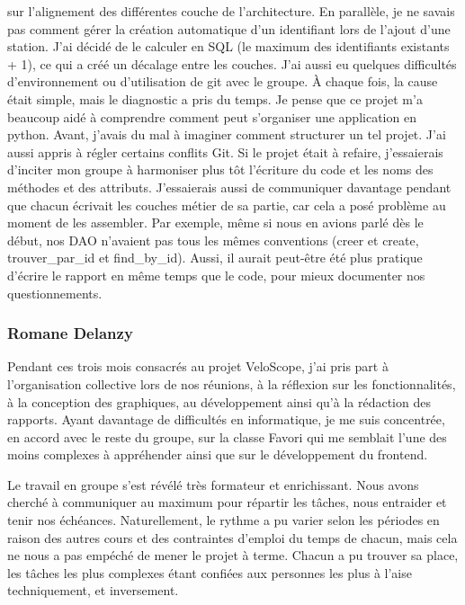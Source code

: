 \documentclass[
  french,
  11pt,
  a4paper,
]{article}
\begin{document}
sur l'alignement des différentes couche de l'architecture. En parallèle,
je ne savais pas comment gérer la création automatique d'un identifiant
lors de l'ajout d'une station. J'ai décidé de le calculer en SQL (le
maximum des identifiants existants + 1), ce qui a créé un décalage entre
les couches. J'ai aussi eu quelques difficultés d'environnement ou
d'utilisation de git avec le groupe. À chaque fois, la cause était
simple, mais le diagnostic a pris du temps. Je pense que ce projet m'a
beaucoup aidé à comprendre comment peut s'organiser une application en
python. Avant, j'avais du mal à imaginer comment structurer un tel
projet. J'ai aussi appris à régler certains conflits Git. Si le projet
était à refaire, j'essaierais d'inciter mon groupe à harmoniser plus tôt
l'écriture du code et les noms des méthodes et des attributs.
J'essaierais aussi de communiquer davantage pendant que chacun écrivait
les couches métier de sa partie, car cela a posé problème au moment de
les assembler. Par exemple, même si nous en avions parlé dès le début,
nos DAO n'avaient pas tous les mêmes conventions (creer et create,
trouver\_par\_id et find\_by\_id). Aussi, il aurait peut-être été plus
pratique d'écrire le rapport en même temps que le code, pour mieux
documenter nos questionnements.

\subsubsection{Romane Delanzy}\label{romane-delanzy}

Pendant ces trois mois consacrés au projet VeloScope, j'ai pris part à
l'organisation collective lors de nos réunions, à la réflexion sur les
fonctionnalités, à la conception des graphiques, au développement ainsi
qu'à la rédaction des rapports. Ayant davantage de difficultés en
informatique, je me suis concentrée, en accord avec le reste du groupe,
sur la classe Favori qui me semblait l'une des moins complexes à
appréhender ainsi que sur le développement du frontend.

Le travail en groupe s'est révélé très formateur et enrichissant. Nous
avons cherché à communiquer au maximum pour répartir les tâches, nous
entraider et tenir nos échéances. Naturellement, le rythme a pu varier
selon les périodes en raison des autres cours et des contraintes
d'emploi du temps de chacun, mais cela ne nous a pas empéché de mener le
projet à terme. Chacun a pu trouver sa place, les tâches les plus
complexes étant confiées aux personnes les plus à l'aise techniquement,
et inversement.
\end{document}
